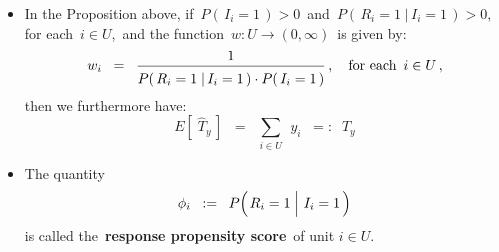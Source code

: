 \begin{remark}
\mbox{}\vskip 0.05cm
\begin{itemize}
\item
	In the Proposition above, if \,$P(\,I_{i}=1\,) >0$\, and \,$P(\,R_{i}=1\;\vert\,I_{i}=1\,) > 0$,\,
	for each \,$i \in U$,\, and the function \,$w : U \longrightarrow (0,\infty)$\, is given by:
	\begin{equation*}
	w_{i} \;\; = \;\; \dfrac{1}{\overset{{\color{white}.}}{P}(\,R_{i}=1\;\vert\,I_{i}=1\,) \cdot P(\,I_{i}=1\,)}\,,
	\quad
	\textnormal{for each \,$i \in U$}\,,
	\end{equation*}
	then we furthermore have:
	\begin{equation*}
	E\!\left[\;\widehat{T}_{y}\,\right]
	\;\; = \;\;
		\underset{i \in U}{\sum}\;\,y_{i}
	\;\; =: \;\;
		T_{y}
	\end{equation*}
\item
	The quantity
	\begin{equation*}
	\phi_{i}
	\;\; := \;\;
		P\!\left(\left.R_{i}\overset{{\color{white}-}}{=}1\;\right\vert\,I_{i}=1\,\right)
	\end{equation*}
	is called the \,\textbf{response propensity score}\, of unit $i \in U$.
\end{itemize}
\end{remark}


